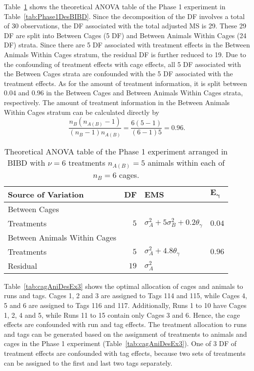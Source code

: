 Table~\ref{tab:Phase1ANOVAEx3} shows the theoretical ANOVA table of the Phase 1 experiment in Table~\ref{tab:Phase1DesBIBD}. Since the decomposition of the DF involves a total of 30 observations, the DF associated with the total adjusted MS is 29. These 29 DF are split into Between Cages (5 DF) and Between Animals Within Cages (24 DF) strata. Since there are 5 DF associated with treatment effects in the Between Animals Within Cages stratum, the residual DF is further reduced to 19. Due to the confounding of treatment effects with cage effects, all 5 DF associated with the Between Cages strata are confounded with the 5 DF associated with the treatment effects. As for the amount of treatment information, it is split between $0.04$ and $0.96$ in the Between Cages and Between Animals Within Cages strata, respectively.  The amount of treatment information in the Between Animals Within Cages stratum can be calculated directly by 
\[\frac{n_B(n_{A(B)} - 1)}{ (n_B - 1)n_{A(B)}} = \frac{6(5-1)}{(6-1)5} =0.96.\]
 
\begin{table}[ht]
\centering
\caption{Theoretical ANOVA table of the Phase 1 experiment arranged in BIBD with $\nu = 6$ treatments $n_{A(B)} = 5$ animals within each of $n_B = 6$ cages.}
\begin{tabular}[t]{lrll} 
\toprule 
\multicolumn{1}{l}{\textbf{Source of Variation}} & \multicolumn{1}{l}{\textbf{DF}} & \multicolumn{1}{l}{\textbf{EMS}}& \multicolumn{1}{l}{$\bm{E_{\gamma}}$}\\ 
\midrule 
Between Cages &  &  &\\ 
\quad Treatments & $5$ & $\sigma_{A}^2+5\sigma_{B}^2+ 0.2\theta_{\gamma}$ &$0.04$\\ \hline 
Between Animals Within Cages &  &  &\\ 
\quad Treatments & $5$ & $\sigma_{A}^2+ 4.8\theta_{\gamma}$ &$0.96$\\ 
\quad Residual & $19$ & $\sigma_{A}^2$ &\\ 
\bottomrule 
\end{tabular} 
\label{tab:Phase1ANOVAEx3} 
\end{table} 

Table~\ref{tab:cagAniDesEx3} shows the optimal allocation of cages and animals to runs and tags. Cages 1, 2 and 3 are assigned to Tags 114 and 115, while Cages 4, 5 and 6 are assigned to Tags 116 and 117. Additionally, Runs 1 to 10 have Cages 1, 2, 4 and 5, while Runs 11 to 15 contain only Cages 3 and 6. Hence, the cage effects are confounded with run and tag effects. The treatment allocation to runs and tags can be generated based on the assignment of treatments to animals and cages in the Phase 1 experiment (Table~\ref{tab:cagAniDesEx3}). One of 3 DF of treatment effects are confounded with tag effects, because two sets of treatments can be assigned to the first and last two tags separately. 

